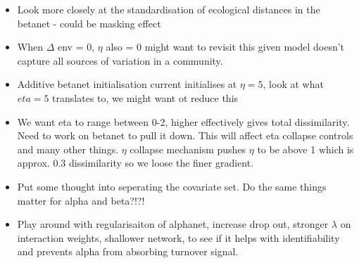 \documentclass{article}
\begin{document}
\begin{itemize}
    \item Look more closely at the standardisation of ecological distances in the betanet - could be masking effect
    \item When $\Delta$ env = 0, $\eta$ also = 0  might want to revisit this given model doesn't capture all sources of variation in a community. 
    \item Additive betanet initialisation current initialises at $\eta = 5$, look at what $eta = 5$ translates to, we might want ot reduce this
    \item We want eta to range between 0-2, higher effectively gives total dissimilarity. Need to work on betanet to pull it down. This will affect eta collapse controls and many other things. $\eta$ collapse mechanism pushes $\eta$ to be above 1 which is approx. 0.3 dissimilarity so we loose the finer gradient. 
    \item Put some thought into seperating the covariate set. Do the same things matter for alpha and beta?!?!
    \item Play around with regularisaiton of alphanet, increase drop out, stronger $\lambda$ on interaction weights, shallower network, to see if it helps with identifiability and prevents alpha from absorbing turnover signal.
\end{itemize}
\end{document}
